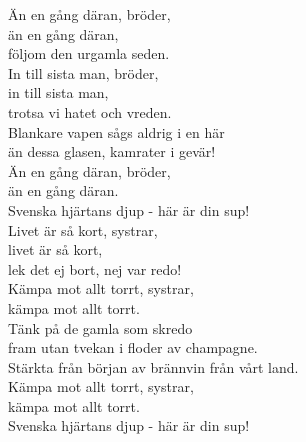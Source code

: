\documentclass[a6paper,10pt]{article}
\begin{document}
\setlength{\oddsidemargin}{-0.37in}
\noindent
\begin{center}
\end{center}
\begin{lyrics}
Än en gång däran, bröder,\\
än en gång däran,\\
följom den urgamla seden.\\
In till sista man, bröder,\\
in till sista man,\\
trotsa vi hatet och vreden. \\
Blankare vapen sågs aldrig i en här\\
än dessa glasen, kamrater i gevär!\\
Än en gång däran, bröder,\\
än en gång däran.\\
Svenska hjärtans djup - här är din sup!
\vspace{5pt}\\
Livet är så kort, systrar,\\
livet är så kort,\\
lek det ej bort, nej var redo!\\
Kämpa mot allt torrt, systrar,\\
kämpa mot allt torrt.\\
Tänk på de gamla som skredo\\
fram utan tvekan i floder av champagne.\\
Stärkta från början av brännvin från vårt land.\\
Kämpa mot allt torrt, systrar,\\
kämpa mot allt torrt.\\
Svenska hjärtans djup - här är din sup! 
\end{lyrics}
\end{document}
